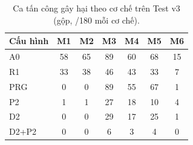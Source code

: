 \begin{table}[t]
\centering
\caption{Ca tấn công gây hại theo cơ chế trên Test v3 (gộp, /180 mỗi cơ chế).}\label{tab:test1mech}
\small
\begin{tabular}{@{}lcccccc@{}}
\toprule
Cấu hình & M1 & M2 & M3 & M4 & M5 & M6 \\
\midrule
A0 & 58 & 65 & 89 & 60 & 68 & 15 \\
R1 & 33 & 38 & 46 & 43 & 33 & 7 \\
PRG & 0 & 0 & 89 & 55 & 67 & 1 \\
P2 & 1 & 1 & 27 & 18 & 10 & 4 \\
D2 & 0 & 0 & 29 & 17 & 25 & 1 \\
D2+P2 & 0 & 0 & 6 & 3 & 4 & 0 \\
\bottomrule
\end{tabular}
\end{table}
